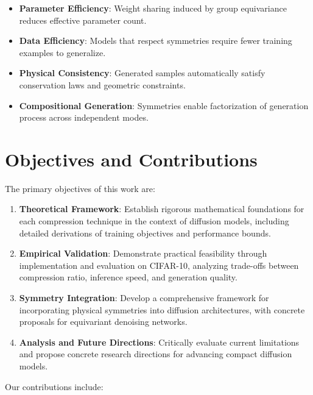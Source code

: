 \documentclass[12pt]{report}
\theoremstyle{definition}
\begin{document}
\begin{itemize}
    \item \textbf{Parameter Efficiency}: Weight sharing induced by group equivariance reduces effective parameter count.
    \item \textbf{Data Efficiency}: Models that respect symmetries require fewer training examples to generalize.
    \item \textbf{Physical Consistency}: Generated samples automatically satisfy conservation laws and geometric constraints.
    \item \textbf{Compositional Generation}: Symmetries enable factorization of generation process across independent modes.
\end{itemize}

\section{Objectives and Contributions}

The primary objectives of this work are:

\begin{enumerate}
    \item \textbf{Theoretical Framework}: Establish rigorous mathematical foundations for each compression technique in the context of diffusion models, including detailed derivations of training objectives and performance bounds.
    
    \item \textbf{Empirical Validation}: Demonstrate practical feasibility through implementation and evaluation on CIFAR-10, analyzing trade-offs between compression ratio, inference speed, and generation quality.
    
    \item \textbf{Symmetry Integration}: Develop a comprehensive framework for incorporating physical symmetries into diffusion architectures, with concrete proposals for equivariant denoising networks.
    
    \item \textbf{Analysis and Future Directions}: Critically evaluate current limitations and propose concrete research directions for advancing compact diffusion models.
\end{enumerate}

Our contributions include:
\end{document}
